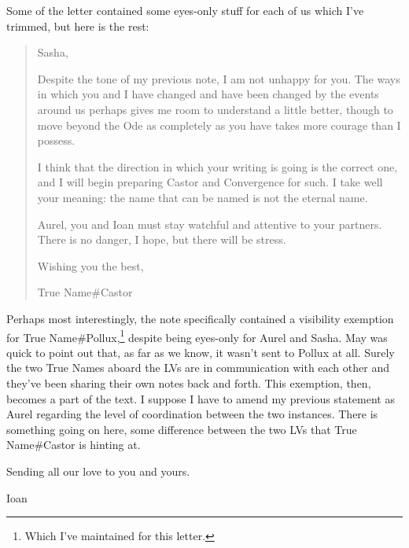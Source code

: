 Some of the letter contained some eyes-only stuff for each of us which I've trimmed, but here is the rest:

\begin{quote}
Sasha,

Despite the tone of my previous note, I am not unhappy for you. The ways in which you and I have changed and have been changed by the events around us perhaps gives me room to understand a little better, though to move beyond the Ode as completely as you have takes more courage than I possess.

I think that the direction in which your writing is going is the correct one, and I will begin preparing Castor and Convergence for such. I take well your meaning: the name that can be named is not the eternal name.

Aurel, you and Ioan must stay watchful and attentive to your partners. There is no danger, I hope, but there will be stress.

Wishing you the best,

True Name\#Castor
\end{quote}

Perhaps most interestingly, the note specifically contained a visibility exemption for True Name\#Pollux,\footnote{Which I've maintained for this letter.} despite being eyes-only for Aurel and Sasha. May was quick to point out that, as far as we know, it wasn't sent to Pollux at all. Surely the two True Names aboard the LVs are in communication with each other and they've been sharing their own notes back and forth. This exemption, then, becomes a part of the text. I suppose I have to amend my previous statement as Aurel regarding the level of coordination between the two instances. There is something going on here, some difference between the two LVs that True Name\#Castor is hinting at.

Sending all our love to you and yours.

Ioan
